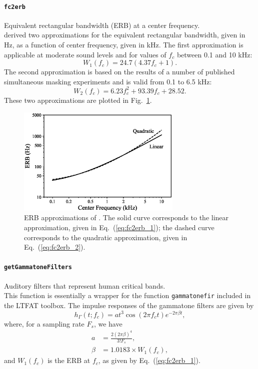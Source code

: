 \documentclass[11pt, oneside]{article}
\newcommand{\figref}[1]{Fig.~\ref{#1}}
\newcommand{\eqnref}[1]{Eq.~(\ref{#1})}
\newcommand{\function}[1]{\paragraph*{\texttt{#1}}}
\begin{document}
\function{fc2erb} Equivalent rectangular bandwidth (ERB) at a center frequency. \\
\citet{GlasbergMoore1990} derived two approximations for the equivalent rectangular bandwidth, given in Hz, as a function of center frequency, given in kHz.
The first approximation is applicable at moderate sound levels and for values of $f_c$ between 0.1 and 10 kHz:
\begin{equation}\label{eq:fc2erb_1}
W_1(f_c) = 24.7(4.37 f_c + 1).
\end{equation}
The second approximation is based on the results of a number of published simultaneous masking experiments and is valid from 0.1 to 6.5 kHz:
\begin{equation}\label{eq:fc2erb_2}
W_2(f_c) = 6.23 f_c^2 + 93.39 f_c + 28.52.
\end{equation}
These two approximations are plotted in \figref{fig:fc2erb}.

\begin{figure}[tb]
    	\centering
    	\includegraphics[width=0.7\textwidth]{figures/fc2erb.eps}
    	\caption{ERB approximations of \citet[Fig.~7]{GlasbergMoore1990}.
	The solid curve corresponds to the linear approximation, given in \eqnref{eq:fc2erb_1};
	the dashed curve corresponds to the quadratic approximation, given in \eqnref{eq:fc2erb_2}.}
	\label{fig:fc2erb}
\end{figure}

\function{getGammatoneFilters} Auditory filters that represent human critical bands. \\
This function is essentially a wrapper for the function \texttt{gammatonefir} included in the LTFAT toolbox.
The impulse responses of the gammatone filters are given by
\begin{equation}
h_\Gamma(t;f_c) = a t^3 \cos(2 \pi f_c t) e^{-2 \pi \beta t},
\end{equation}
where, for a sampling rate $F_s$, we have
\begin{equation}
\begin{aligned}
a &= \frac{2 (2 \pi \beta)^4}{3! F_s}, \\
\beta &= 1.0183 \times W_1(f_c),
\end{aligned}
\end{equation}
and $W_1(f_c)$ is the ERB at $f_c$, as given by \eqnref{eq:fc2erb_1}.
\end{document}
